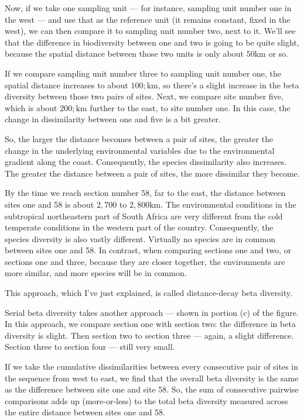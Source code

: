 \documentclass[
  10pt,
]{book}
\begin{document}
Now, if we take one sampling unit --- for instance, sampling unit number
one in the west --- and use that as the reference unit (it remains
constant, fixed in the west), we can then compare it to sampling unit
number two, next to it. We'll see that the difference in biodiversity
between one and two is going to be quite slight, because the spatial
distance between those two units is only about \(50\mathrm{km}\) or so.

If we compare sampling unit number three to sampling unit number one,
the spatial distance increases to about \(100;\mathrm{km}\), so there's
a slight increase in the beta diversity between those two pairs of
sites. Next, we compare site number five, which is about
\(200;\mathrm{km}\) further to the east, to site number one. In this
case, the change in dissimilarity between one and five is a bit greater.

So, the larger the distance becomes between a pair of sites, the greater
the change in the underlying environmental variables due to the
environmental gradient along the coast. Consequently, the species
dissimilarity also increases. The greater the distance between a pair of
sites, the more dissimilar they become.

By the time we reach section number 58, far to the east, the distance
between sites one and 58 is about \(2{,}700\) to
\(2{,}800 \mathrm{km}\). The environmental conditions in the subtropical
northeastern part of South Africa are very different from the cold
temperate conditions in the western part of the country. Consequently,
the species diversity is also vastly different. Virtually no species are
in common between sites one and 58. In contrast, when comparing sections
one and two, or sections one and three, because they are closer
together, the environments are more similar, and more species will be in
common.

This approach, which I've just explained, is called distance-decay beta
diversity.

Serial beta diversity takes another approach --- shown in portion (c) of
the figure. In this approach, we compare section one with section two:
the difference in beta diversity is slight. Then section two to section
three --- again, a slight difference. Section three to section four ---
still very small.

If we take the cumulative dissimilarities between every consecutive pair
of sites in the sequence from west to east, we find that the overall
beta diversity is the same as the difference between site one and site
58. So, the sum of consecutive pairwise comparisons adds up
(more-or-less) to the total beta diversity measured across the entire
distance between sites one and 58.
\end{document}
